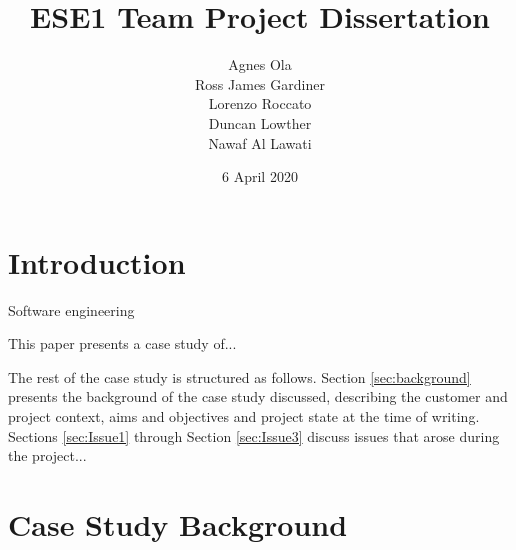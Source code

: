 \documentclass{l3proj}
\begin{document}
\title{ESE1 Team Project Dissertation}

\author{Agnes Ola \\
        Ross James Gardiner \\
        Lorenzo Roccato \\
        Duncan Lowther \\
        Nawaf Al Lawati}

\date{6 April 2020}

\maketitle

\begin{abstract}


\end{abstract}

\educationalconsent

\newpage
\section{Introduction}



Software engineering 

This paper presents a case study of... 

The rest of the case study is structured as follows.  Section
\ref{sec:background} presents the background of the case study
discussed, describing the customer and project context, aims and
objectives and project state at the time of writing.  Sections
\ref{sec:Issue1} through Section \ref{sec:Issue3} discuss issues that
arose during the project...

\section{Case Study Background}
\end{document}

